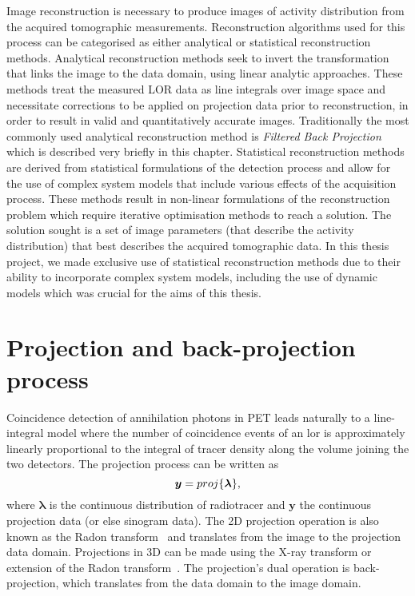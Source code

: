Image reconstruction is necessary to produce images of activity distribution from the acquired tomographic measurements. Reconstruction algorithms used for this process can be categorised as either analytical or statistical reconstruction methods. 
Analytical reconstruction methods seek to invert the transformation that links the image to the data domain, using linear analytic approaches. These methods treat the measured LOR data as line integrals over image space and necessitate corrections to be applied on projection data prior to reconstruction, in order to result in valid and quantitatively accurate images. Traditionally the most commonly used analytical reconstruction method is \textit{Filtered Back Projection} which is described very briefly in this chapter. 
Statistical reconstruction methods are derived from statistical formulations of the detection process and allow for the use of complex system models that include various effects of the acquisition process. These methods result in non-linear formulations of the reconstruction problem which require iterative optimisation methods to reach a solution. The solution sought is a set of image parameters (that describe the activity distribution) that best describes the acquired tomographic data. 
In this thesis project, we made exclusive use of statistical reconstruction methods due to their ability to incorporate complex system models, including the use of dynamic models which was crucial for the aims of this thesis.

\section{Projection and back-projection process}
Coincidence detection of annihilation photons in PET leads naturally to a line-integral model where the number of coincidence events of an \gls{lor} is approximately linearly proportional to the integral of tracer density along the volume joining the two detectors. 
The projection process can be written as
\begin{equation}
   \bm y = proj\{\bm{\lambda}\}  \\, 
  \label{eqn:Radon}
\end{equation}
where $\bm{\lambda}$ is the continuous distribution of radiotracer and $\bm{y}$ the continuous projection data (or else sinogram data).
The 2D projection operation is also known as the Radon transform~\cite{radon1917,Radon1986} and translates from the image to the projection data domain. Projections in 3D can be made using the X-ray transform or extension of the Radon transform~\cite{Natterer1986}. 
The projection's dual operation is back-projection, which translates from the data domain to the image domain.
%
